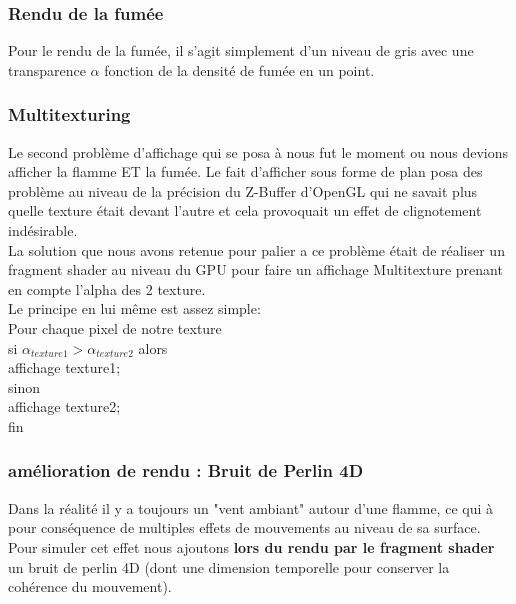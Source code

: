 \documentclass[a4paper,10pt]{article}
\begin{document}
\subsubsection{Rendu de la fumée}

	Pour le rendu de la fumée, il s'agit simplement d'un niveau de gris avec une transparence $\alpha$ fonction de la densité de fumée en un point.\\

\subsubsection{Multitexturing}

	Le second problème d'affichage qui se posa à nous fut le moment ou nous devions afficher la flamme ET la fumée. Le fait d'afficher sous forme de plan posa des problème au niveau de la précision du Z-Buffer d'OpenGL qui ne savait plus quelle texture était devant l'autre et cela provoquait un effet de clignotement indésirable.\\

La solution que nous avons retenue pour palier a ce problème était de réaliser un fragment shader au niveau du GPU pour faire un affichage Multitexture prenant en compte l'alpha des 2 texture.\\

Le principe en lui même est assez simple:\\
Pour chaque pixel de notre texture\\
      si $\alpha_{texture1}>\alpha_{texture2}$ alors \\
            affichage texture1;\\
      sinon \\
            affichage texture2;\\
fin\\


\subsubsection{amélioration de rendu : Bruit de Perlin 4D}

Dans la réalité il y a toujours un "vent ambiant" autour d'une flamme, ce qui à pour conséquence de multiples effets de mouvements au niveau de sa surface. Pour simuler cet effet nous ajoutons \textbf{lors du rendu par le fragment shader} un bruit de perlin 4D (dont une dimension temporelle pour conserver la cohérence du mouvement).\\
\end{document}
